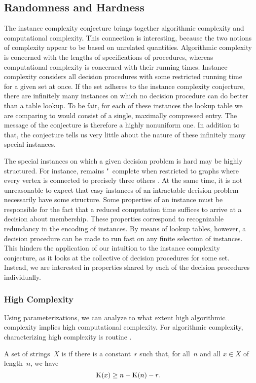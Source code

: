 \subsection{Randomness and Hardness}
\label{sec:algorithmic:randomness_hardness}%
The instance complexity conjecture brings together algorithmic complexity and computational complexity.
This connection is interesting, because the two notions of complexity appear to be based on unrelated quantities.
Algorithmic complexity is concerned with the lengths of specifications of procedures, whereas computational complexity is concerned with their running times.
Instance complexity considers all decision procedures with some restricted running time for a given set at once.
If the set adheres to the instance complexity conjecture, there are infinitely many instances on which no decision procedure can do better than a table lookup.
To be fair, for each of these instances the lookup table we are comparing to would consist of a single, maximally compressed entry.
The message of the conjecture is therefore a highly nonuniform one.
In addition to that, the conjecture tells us very little about the nature of these infinitely many special instances.

The special instances on which a given decision problem is hard may be highly structured.
For instance,  remains "~complete when restricted to graphs where every vertex is connected to precisely three others \parencite{garey1979computers}.
At the same time, it is not unreasonable to expect that easy instances of an intractable decision problem necessarily have some structure.
Some properties of an instance must be responsible for the fact that a reduced computation time suffices to arrive at a decision about membership.
These properties correspond to recognizable redundancy in the encoding of instances.
By means of lookup tables, however, a decision procedure can be made to run fast on any finite selection of instances.
This hinders the application of our intuition to the instance complexity conjecture, as it looks at the collective of decision procedures for some set.
Instead, we are interested in properties shared by each of the decision procedures individually.

\subsubsection{High Complexity}
Using parameterizations, we can analyze to what extent high algorithmic complexity implies high computational complexity.
For algorithmic complexity, characterizing high complexity is routine \parencite[Theorem~3.3.1]{li2008introduction}.
\begin{definition}
\label{def:random}%
  A set of strings~$X$ is  if there is a constant~$r$ such that, for all~$n$ and all $x \in X$ of length~$n$, we have
  \begin{equation*}
    \operatorname{K}(x) \ge n + \operatorname{K}(n) - r.
  \end{equation*}
\end{definition}

